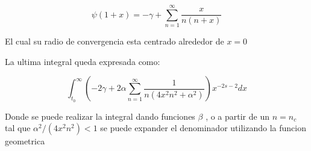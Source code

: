 \begin{equation}
\psi (1+x) = - \gamma + \sum _{n=1} ^{\infty} \frac{x}{n(n+x)}
\end{equation}

El cual su radio de convergencia esta centrado alrededor de $x = 0$

La ultima integral queda expresada como:

\begin{equation}
\int _{t_0} ^{\infty} 
\left(
-2 \gamma + 2 \alpha \sum _{n=1} ^{\infty} \frac{1}{n(4 x^2 n^2+\alpha ^2)}
\right)
x ^{-2s-2} dx
\end{equation}

Donde se puede realizar la integral dando funciones $\beta$ , o a partir de un $n = n_c$ tal que $\alpha ^2 /(4 x^2 n^2) < 1$ se puede expander el denominador utilizando la funcion geometrica








